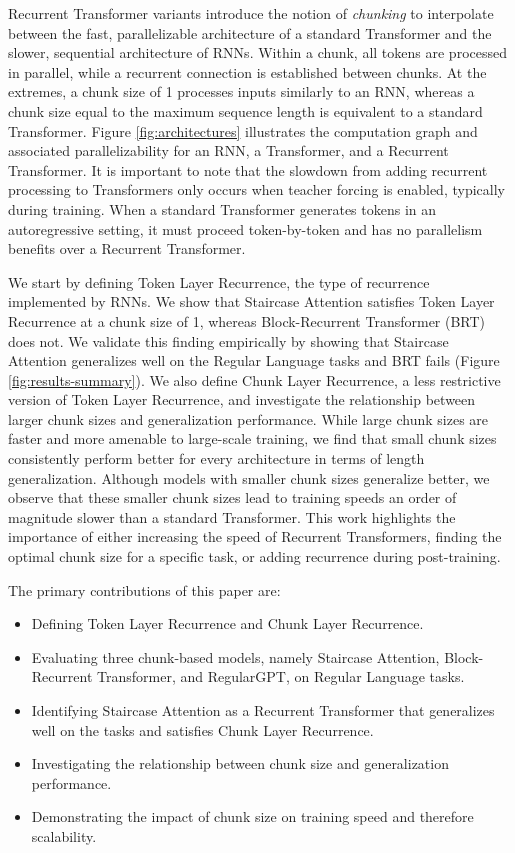     Recurrent Transformer variants introduce the notion of \textit{chunking} to interpolate between the fast, parallelizable architecture of a standard Transformer and the slower, sequential architecture of RNNs. Within a chunk, all tokens are processed in parallel, while a recurrent connection is established between chunks. At the extremes, a chunk size of 1 processes inputs similarly to an RNN, whereas a chunk size equal to the maximum sequence length is equivalent to a standard Transformer. Figure \ref{fig:architectures} illustrates the computation graph and associated parallelizability for an RNN, a Transformer, and a Recurrent Transformer. It is important to note that the slowdown from adding recurrent processing to Transformers only occurs when teacher forcing is enabled, typically during training. When a standard Transformer generates tokens in an autoregressive setting, it must proceed token-by-token and has no parallelism benefits over a Recurrent Transformer.
    
    
    We start by defining Token Layer Recurrence, the type of recurrence implemented by RNNs. We show that Staircase Attention \citep{ju_staircase_2022} satisfies Token Layer Recurrence at a chunk size of 1, whereas Block-Recurrent Transformer (BRT) \citep{hutchins_block-recurrent_2022} does not. We validate this finding empirically by showing that Staircase Attention generalizes well on the Regular Language tasks and BRT fails (Figure \ref{fig:results-summary}). We also define Chunk Layer Recurrence, a less restrictive version of Token Layer Recurrence, and investigate the relationship between larger chunk sizes and generalization performance. While large chunk sizes are faster and more amenable to large-scale training, we find that small chunk sizes consistently perform better for every architecture in terms of length generalization. Although models with smaller chunk sizes generalize better, we observe that these smaller chunk sizes lead to training speeds an order of magnitude slower than a standard Transformer. This work highlights the importance of either increasing the speed of Recurrent Transformers, finding the optimal chunk size for a specific task, or adding recurrence during post-training.
    
    The primary contributions of this paper are:
    \begin{itemize}
    \item Defining Token Layer Recurrence and Chunk Layer Recurrence.
    \item Evaluating three chunk-based models, namely Staircase Attention, Block-Recurrent Transformer, and RegularGPT, on Regular Language tasks.
    \item Identifying Staircase Attention as a Recurrent Transformer that generalizes well on the tasks and satisfies Chunk Layer Recurrence.
    \item Investigating the relationship between chunk size and generalization performance.
    \item Demonstrating the impact of chunk size on training speed and therefore scalability.
    \end{itemize}
    
